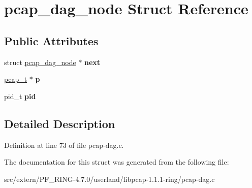 \hypertarget{structpcap__dag__node}{
\section{pcap\_\-dag\_\-node Struct Reference}
\label{structpcap__dag__node}
}
\subsection*{Public Attributes}
\begin{DoxyCompactItemize}
\item 
\hypertarget{structpcap__dag__node_a08da0e64a7ec53d3eec60c36a0665992}{
struct \hyperlink{structpcap__dag__node}{pcap\_\-dag\_\-node} $\ast$ {\bfseries next}}
\label{structpcap__dag__node_a08da0e64a7ec53d3eec60c36a0665992}

\item 
\hypertarget{structpcap__dag__node_ae8f9c495f31b1eecb813c8a53baa4d07}{
\hyperlink{structpcap}{pcap\_\-t} $\ast$ {\bfseries p}}
\label{structpcap__dag__node_ae8f9c495f31b1eecb813c8a53baa4d07}

\item 
\hypertarget{structpcap__dag__node_a4c2b6e2e4800b48a9c86cdaad87415da}{
pid\_\-t {\bfseries pid}}
\label{structpcap__dag__node_a4c2b6e2e4800b48a9c86cdaad87415da}

\end{DoxyCompactItemize}


\subsection{Detailed Description}


Definition at line 73 of file pcap-\/dag.c.



The documentation for this struct was generated from the following file:\begin{DoxyCompactItemize}
\item 
src/extern/PF\_\-RING-\/4.7.0/userland/libpcap-\/1.1.1-\/ring/pcap-\/dag.c\end{DoxyCompactItemize}
